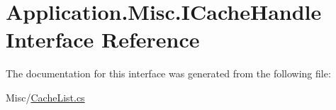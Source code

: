 \hypertarget{interface_application_1_1_misc_1_1_i_cache_handle}{}\section{Application.\+Misc.\+I\+Cache\+Handle Interface Reference}
\label{interface_application_1_1_misc_1_1_i_cache_handle}


The documentation for this interface was generated from the following file\+:\begin{DoxyCompactItemize}
\item 
Misc/\mbox{\hyperlink{_cache_list_8cs}{Cache\+List.\+cs}}\end{DoxyCompactItemize}
